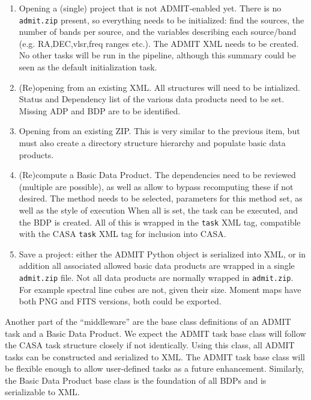\documentclass{article}
\begin{document}
\begin{enumerate}

\item
Opening a (single) project that is not ADMIT-enabled yet.  There is no
{\tt admit.zip} present, so everything needs to be initialized: find the
sources, the number of bands per source, and the variables describing
each source/band (e.g. RA,DEC,vlsr,freq ranges etc.). The ADMIT XML needs
to be created.  No other tasks will be run in the pipeline, although this
summary could be seen as the default initialization task.
%

\item
(Re)opening from an existing XML.  All structures will need to be 
intialized. Status and Dependency list of the various data products
need to be set. Missing ADP and BDP are to be identified.

\item
Opening from an existing ZIP. This is very similar to the previous
item, but must also create a directory structure hierarchy and 
populate basic data products.

\item
(Re)compute a Basic Data Product. The dependencies need to be reviewed
(multiple are possible), as well as allow to bypass recomputing these
if not desired.  The method needs to be selected, parameters for this
method set, as well as the style of execution When all is set, the task
can be executed, and the BDP is created. All of this is wrapped in the
{\tt task} XML tag, compatible with the CASA {\tt task}
XML tag for inclusion into CASA.

\item
Save a project:  either the ADMIT Python object is serialized into XML, 
or in addition all associated allowed basic data products 
are wrapped in a single {\tt admit.zip} file. Not all data products
are normally wrapped in {\tt admit.zip}. For example spectral line cubes are not, given
their size. Moment maps have both PNG and FITS versions, both could be
exported.

\end{enumerate}

Another part of the ``middleware'' are the base class definitions of
an ADMIT task and a Basic Data Product. We expect the ADMIT task base
class will follow the CASA task structure closely if not identically.
Using this class, all ADMIT tasks can be constructed and serialized to XML.
The ADMIT task base class will be flexible enough to allow user-defined
tasks as a future enhancement.  Similarly, the Basic Data Product base
class is the foundation of all BDPs and is serializable to XML.
\end{document}
